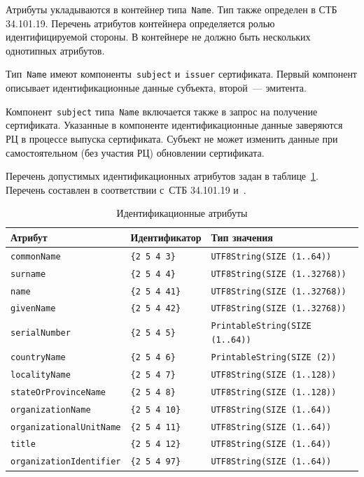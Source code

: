 Атрибуты укладываются в контейнер типа~\texttt{Name}. Тип также определен в 
СТБ 34.101.19. Перечень атрибутов контейнера определяется ролью идентифицируемой 
стороны. В контейнере не должно быть нескольких однотипных атрибутов.

Тип~\texttt{Name} имеют компоненты~\texttt{subject} и~\texttt{issuer} 
сертификата. Первый компонент описывает идентификационные данные субъекта, 
второй~--- эмитента.

Компонент~\texttt{subject} типа~\texttt{Name} включается также в запрос на 
получение сертификата. Указанные в компоненте идентификационные данные
заверяются РЦ в процессе выпуска сертификата. Субъект не может изменить 
данные при самостоятельном (без участия РЦ) обновлении сертификата. 

Перечень допустимых идентификационных атрибутов задан в 
таблице~\ref{Table.ENTITIES.Attrs}. Перечень составлен в соответствии 
с~СТБ 34.101.19 и~\cite{X520}.  

\begin{table}[bht]
\caption{Идентификационные атрибуты}
\label{Table.ENTITIES.Attrs}
\begin{tabular}{|l|l|l|}
\hline
Атрибут & Идентификатор & Тип значения\\
\hline
\hline
\texttt{commonName} & \verb|{2 5 4 3}| & \texttt{UTF8String(SIZE (1..64))}\\
\texttt{surname} & \verb|{2 5 4 4}| & \texttt{UTF8String(SIZE (1..32768))}\\
\texttt{name} & \verb|{2 5 4 41}| & \texttt{UTF8String(SIZE (1..32768))}\\
\texttt{givenName} & \verb|{2 5 4 42}| & \texttt{UTF8String(SIZE (1..32768))}\\
\texttt{serialNumber} & \verb|{2 5 4 5}| & \texttt{PrintableString(SIZE (1..64))}\\
\texttt{countryName} & \verb|{2 5 4 6}| & \texttt{PrintableString(SIZE (2))}\\
\texttt{localityName} & \verb|{2 5 4 7}| & \texttt{UTF8String(SIZE (1..128))}\\
\texttt{stateOrProvinceName} & \verb|{2 5 4 8}| & \texttt{UTF8String(SIZE (1..128))}\\
\texttt{organizationName} & \verb|{2 5 4 10}| & \texttt{UTF8String(SIZE (1..64))}\\
\texttt{organizationalUnitName} & \verb|{2 5 4 11}| & \texttt{UTF8String(SIZE (1..64))}\\
\texttt{title} & \verb|{2 5 4 12}| & \texttt{UTF8String(SIZE (1..64))}\\
\texttt{organizationIdentifier} & \verb|{2 5 4 97}| & \texttt{UTF8String(SIZE (1..64))}\\
\hline                                      
\end{tabular}
\end{table}

